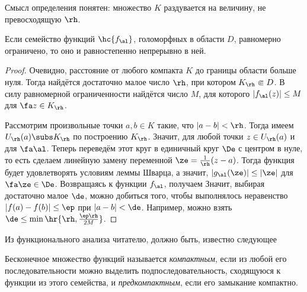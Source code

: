 \documentclass[a4paper]{article}
\begin{document}
Смысл определения понятен: множество $K$ раздувается на величину, не превосходящую $\rh$.

\begin{lemma}
Если семейство функций $\hc{f_\al}$, голоморфных в области $D$, равномерно ограничено, то оно и равностепенно
непрерывно в ней.
\end{lemma}
\begin{proof}
Очевидно, расстояние от любого компакта $K$ до границы области больше нуля. Тогда найдётся достаточно малое число $\rh$,
при котором $K_\rh \Subset D$. В силу равномерной ограниченности найдётся число $M$, для которого $|f_\al(z)|\le M$ для $\fa z \in K_\rh$.

Рассмотрим произвольные точки $a,b\in K$ такие, что $|a-b|<\rh$. Тогда имеем $U_\rh(a) \subs K_\rh$ по построению $K_\rh$.
Значит,
для любой точки $z \in U_\rh(a)$ и для $\fa \al$. Теперь переведём этот круг в единичный круг $\De$ с центром
в нуле, то есть сделаем линейную замену переменной $\ze = \frac{1}{\rh}(z-a)$. Тогда функция
будет удовлетворять условиям леммы Шварца, а значит, $|g_\al(\ze)| \le |\ze|$ для $\fa \ze \in \De$. Возвращаясь
к функции $f_\al$, получаем
Значит, выбирая достаточно малое $\de$, можно добиться того, чтобы выполнялось неравенство $|f(a)-f(b)|\le \ep$ при $|a-b|<\de$.
Например, можно взять $\de \le \min \hr{\rh, \frac{\ep\rh}{2M}}$.
\end{proof}

Из функционального анализа читателю, должно быть, известно следующее

\begin{df}
Бесконечное множество функций называется \emph{компактным}, если из любой его последовательности можно
выделить подпоследовательность, сходящуюся к функции из этого семейства, и \emph{предкомпактным},
если его замыкание компактно.
\end{df}
\end{document}
